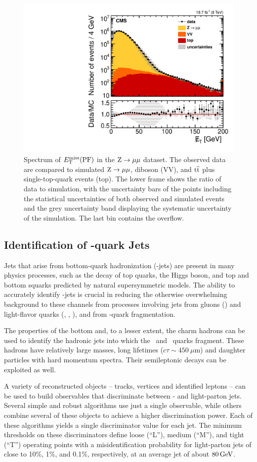 \begin{figure}[htp]\centering
\includegraphics[width=.7\linewidth]{figs/cms/pFlowPFMET.pdf}
\caption{Spectrum of $E_{\mathrm{T}}^{\text{miss}} (\mathrm{PF})$ in the $\mathrm{Z}\rightarrow\mu\mu$ dataset.
The observed data are compared to simulated $\mathrm{Z}\rightarrow\mu\mu$,
diboson (VV), and $\mathrm{t}\overline{\mathrm{t}}$ plus single-top-quark events (top).
The lower frame shows the ratio of data to simulation, with the
uncertainty bars of the points including the statistical uncertainties
of both observed and simulated events and the grey uncertainty band
displaying the systematic uncertainty of the simulation. The last bin contains the overflow.\label{fig:met_distribution}}
\end{figure}

\subsection{Identification of \PQb-quark Jets}
\label{sec:btag}
Jets that arise from bottom-quark hadronization (\cPqb-jets) are
present in many physics processes, such as the decay of top quarks,
the Higgs boson, and top and bottom squarks predicted by natural supersymmetric models. 
The ability to accurately identify \cPqb-jets is crucial in reducing
the otherwise overwhelming background to these channels from processes
involving jets from gluons (\cPg) and light-flavor quarks (\cPqu,
\cPqd, \cPqs), and from \cPqc-quark fragmentation. 

The properties of the bottom and, to a lesser extent, the charm
hadrons can be used to identify the hadronic jets into which the
\cPqb\ and \cPqc\ quarks fragment.  These hadrons have relatively
large masses, long lifetimes ($c\tau\sim 450~\mu\mathrm{m}$) and daughter particles with hard momentum
spectra. Their semileptonic decays can be exploited as well.

A variety of reconstructed objects -- tracks, vertices and identified
leptons -- can be used to build observables that discriminate between
\Pqb- and light-parton jets. Several simple and robust algorithms use
just a single observable, while others combine several of these
objects to achieve a higher discrimination power. Each of these
algorithms yields a single discriminator value for each jet. The
minimum thresholds on these discriminators define loose (``L''), medium
(``M''), and tight (``T'') operating points with a misidentification
probability for light-parton jets of close to 10\%, 1\%, and 0.1\%,
respectively, at an average jet \pt of about $80 \,\text{Ge\hspace{-.08em}V}$.


